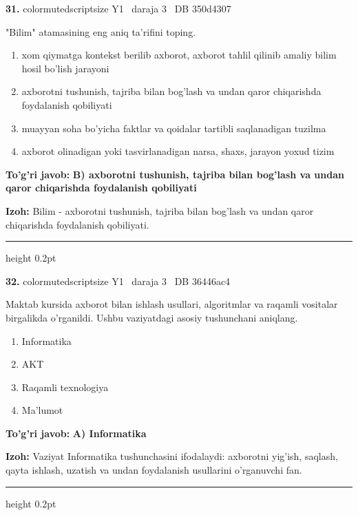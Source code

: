 \documentclass[10pt,a4paper,oneside]{article}
\begin{document}
\noindent\textbf{\color{ink}31.}  {color{muted}scriptsize Y1 \textbullet\ daraja 3 \textbullet\ DB 350d4307}
\par
"Bilim" atamasining eng aniq ta'rifini toping.
\begin{enumerate}[label=\Alph*),leftmargin=9mm]
\item xom qiymatga kontekst berilib axborot, axborot tahlil qilinib amaliy bilim hosil bo'lish jarayoni
\item axborotni tushunish, tajriba bilan bog'lash va undan qaror chiqarishda foydalanish qobiliyati
\item muayyan soha bo'yicha faktlar va qoidalar tartibli saqlanadigan tuzilma
\item axborot olinadigan yoki tasvirlanadigan narsa, shaxs, jarayon yoxud tizim
\end{enumerate}
\begin{tcolorbox}[enhanced,breakable,colback=teal!4,colframe=teal!50!black,boxrule=0.5pt,arc=1.1mm,left=3mm,right=3mm,top=1.7mm,bottom=1.7mm,before skip=2mm,after skip=2mm]
\textbf{\color{teal}To'g'ri javob:} \textbf{B) axborotni tushunish, tajriba bilan bog'lash va undan qaror chiqarishda foydalanish qobiliyati}
\par\smallskip
\textbf{Izoh:} Bilim - axborotni tushunish, tajriba bilan bog'lash va undan qaror chiqarishda foydalanish qobiliyati.
\end{tcolorbox}
\vspace{2mm}\hrule height 0.2pt \vspace{3mm}

\noindent\textbf{\color{ink}32.}  {color{muted}scriptsize Y1 \textbullet\ daraja 3 \textbullet\ DB 36446ac4}
\par
Maktab kursida axborot bilan ishlash usullari, algoritmlar va raqamli vositalar birgalikda o'rganildi. Ushbu vaziyatdagi asosiy tushunchani aniqlang.
\begin{enumerate}[label=\Alph*),leftmargin=9mm]
\item Informatika
\item AKT
\item Raqamli texnologiya
\item Ma'lumot
\end{enumerate}
\begin{tcolorbox}[enhanced,breakable,colback=teal!4,colframe=teal!50!black,boxrule=0.5pt,arc=1.1mm,left=3mm,right=3mm,top=1.7mm,bottom=1.7mm,before skip=2mm,after skip=2mm]
\textbf{\color{teal}To'g'ri javob:} \textbf{A) Informatika}
\par\smallskip
\textbf{Izoh:} Vaziyat Informatika tushunchasini ifodalaydi: axborotni yig'ish, saqlash, qayta ishlash, uzatish va undan foydalanish usullarini o'rganuvchi fan.
\end{tcolorbox}
\vspace{2mm}\hrule height 0.2pt \vspace{3mm}
\end{document}

